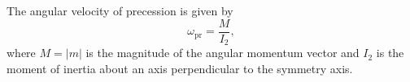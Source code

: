 The angular velocity of precession is given by
$$\omega_{\text{pr}} = \frac{M}{I_2},$$
where $M = |m|$ is the magnitude of the angular momentum vector and $I_2$ is the moment of inertia about an axis perpendicular to the symmetry axis.
